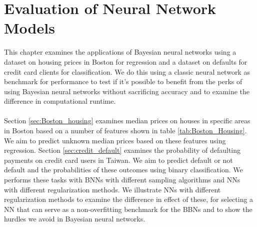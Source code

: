 \chapter{Evaluation of Neural Network Models} \label{chap:eval_NN}
This chapter examines the applications of Bayesian neural networks using a dataset on housing prices in Boston for regression and a dataset on defaults for credit card clients for classification. We do this using a classic neural network as benchmark for performance to test if it's possible to benefit from the perks of using Bayesian neural networks without sacrificing accuracy and to examine the difference in computational runtime. \\
\\
Section \ref{sec:Boston_housing} examines median prices on houses in specific areas in Boston based on a number of features shown in table \ref{tab:Boston_Housing}. We aim to predict unknown median prices based on these features using regression. Section \ref{sec:credit_default} examines the probability of defaulting payments on credit card users in Taiwan. We aim to predict default or not default and the probabilities of these outcomes using binary classification. We performs these tasks with BNNs with different sampling algorithms and NNs with different regularization methods. We illustrate NNs with different regularization methods to examine the difference in effect of these, for selecting a NN that can serve as a non-overfitting benchmark for the BBNs and to show the hurdles we avoid in Bayesian neural networks. 

